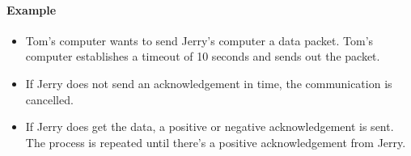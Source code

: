 \documentclass[../main.tex]{subfiles}
\begin{document}
\paragraph{Example}

\begin{itemize}
    \item Tom’s computer wants to send Jerry’s computer a data packet. Tom’s computer establishes a timeout of 10 seconds and sends out the packet.
    \item If Jerry does not send an acknowledgement in time, the communication is cancelled.
    \item If Jerry does get the data, a positive or negative acknowledgement is sent. The process is repeated until there's a positive acknowledgement from Jerry.
\end{itemize}
\end{document}
